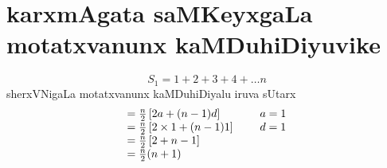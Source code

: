 \chapter{karxmAgata saMKeyxgaLa motatxvanunx kaMDuhiDiyuvike}


$$
S_{1} = 1+2+3+4+\ldots n 
$$
sherxVNigaLa motatxvanunx kaMDuhiDiyalu iruva sUtarx
$$
\begin{array}[t]{l}
=\frac{n}{2}\left[2a+(n-1)d\right]\\
=\frac{n}{2}\left[2\times 1 +(n-1)1\right]\\
=\frac{n}{2}\left[2+n-1\right] \\
=\frac{n}{2}(n+1)
\end{array}
\hspace{0.5cm}
\begin{array}[t]{l}
a = 1\\
d=1
\end{array}
$$
